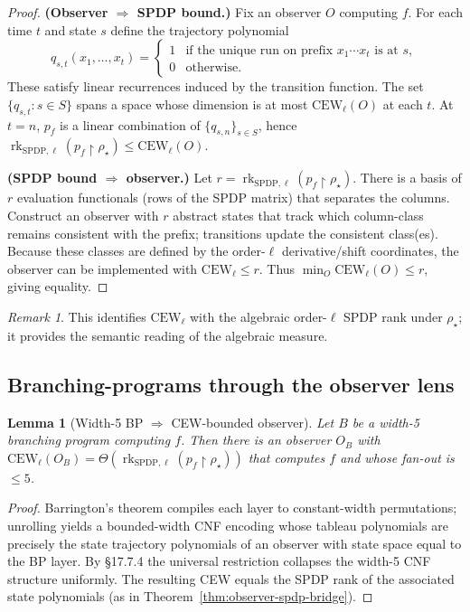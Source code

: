 \documentclass[12pt]{article}
\newtheorem{lemma}[theorem]{Lemma}
\theoremstyle{definition}
\theoremstyle{definition}
\theoremstyle{remark}
\newtheorem{remark}{Remark}
\theoremstyle{remark}
\begin{document}
\begin{proof}
\textbf{(Observer $\Rightarrow$ SPDP bound.)}
Fix an observer $O$ computing $f$. For each time $t$ and state $s$ define the trajectory polynomial
\[
q_{s,t}(x_1,\ldots,x_t)=\begin{cases}
1 & \text{if the unique run on prefix }x_1\cdots x_t\text{ is at }s,\\
0 & \text{otherwise}.
\end{cases}
\]
These satisfy linear recurrences induced by the transition function. The set $\{q_{s,t}:s\in S\}$ spans a space whose dimension is at most $\mathrm{CEW}_\ell(O)$ at each $t$. At $t=n$, $p_f$ is a linear combination of $\{q_{s,n}\}_{s\in S}$, hence $\operatorname{rk}_{\mathrm{SPDP},\ell}(p_f\upharpoonright\rho_\star)\le\mathrm{CEW}_\ell(O)$.

\textbf{(SPDP bound $\Rightarrow$ observer.)}
Let $r=\operatorname{rk}_{\mathrm{SPDP},\ell}(p_f\upharpoonright\rho_\star)$. There is a basis of $r$ evaluation functionals (rows of the SPDP matrix) that separates the columns. Construct an observer with $r$ abstract states that track which column-class remains consistent with the prefix; transitions update the consistent class(es). Because these classes are defined by the order-$\ell$ derivative/shift coordinates, the observer can be implemented with $\mathrm{CEW}_\ell\le r$. Thus $\min_O\mathrm{CEW}_\ell(O)\le r$, giving equality.
\end{proof}

\begin{remark}
This identifies $\mathrm{CEW}_\ell$ with the algebraic order-$\ell$ SPDP rank under $\rho_\star$; it provides the semantic reading of the algebraic measure.
\end{remark}

\subsection{Branching-programs through the observer lens}

\begin{lemma}[Width-5 BP $\Rightarrow$ CEW-bounded observer]\label{lem:bp-cew-observer}
Let $B$ be a width-5 branching program computing $f$. Then there is an observer $O_B$ with $\mathrm{CEW}_\ell(O_B)=\Theta(\operatorname{rk}_{\mathrm{SPDP},\ell}(p_f\upharpoonright\rho_\star))$ that computes $f$ and whose fan-out is $\le 5$.
\end{lemma}

\begin{proof}
Barrington's theorem compiles each layer to constant-width permutations; unrolling yields a bounded-width CNF encoding whose tableau polynomials are precisely the state trajectory polynomials of an observer with state space equal to the BP layer. By \S17.7.4 the universal restriction collapses the width-5 CNF structure uniformly. The resulting CEW equals the SPDP rank of the associated state polynomials (as in Theorem~\ref{thm:observer-spdp-bridge}).
\end{proof}
\end{document}
